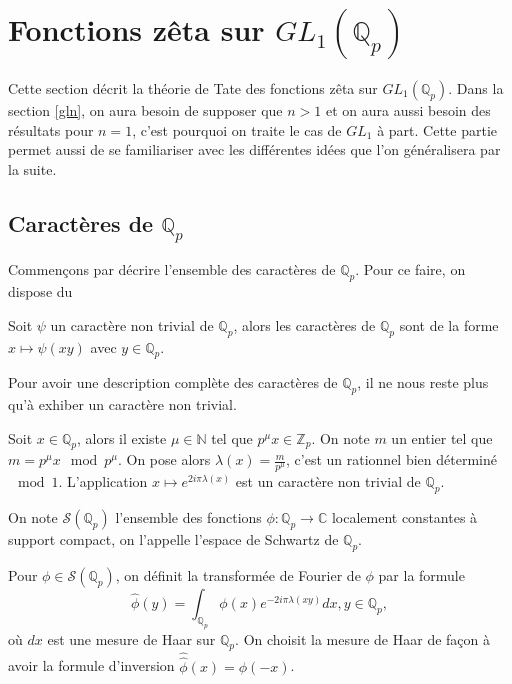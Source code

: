 \section{Fonctions zêta sur $GL_1(\mathbb{Q}_p)$}

\label{gl1}

Cette section décrit la théorie de Tate \cite{tate} des fonctions zêta sur $GL_1(\mathbb{Q}_p)$. Dans la section \ref{gln}, on aura besoin de supposer que $n > 1$ et on aura aussi besoin des résultats pour $n=1$, c'est pourquoi on traite le cas de $GL_1$ à part. Cette partie permet aussi de se familiariser avec les différentes idées que l'on généralisera par la suite.

\subsection{Caractères de $\mathbb{Q}_p$}
\label{caracqp}
Commençons par décrire l'ensemble des caractères de $\mathbb{Q}_p$. Pour ce faire, on dispose du

\begin{lemme}
Soit $\psi$ un caractère non trivial de $\mathbb{Q}_p$, alors les caractères de $\mathbb{Q}_p$ sont de la forme $x \mapsto \psi(xy)$ avec $y \in \mathbb{Q}_p$.
\end{lemme}

Pour avoir une description complète des caractères de $\mathbb{Q}_p$, il ne nous reste plus qu'à exhiber un caractère non trivial.

Soit $x \in \mathbb{Q}_p$, alors il existe $\mu \in \mathbb{N}$ tel que $p^\mu x \in \mathbb{Z}_p$. On note $m$ un entier tel que $m = p^\mu x \mod p^\mu$. On pose alors $\lambda(x) = \frac{m}{p^\mu}$, c'est un rationnel bien déterminé $\mod 1$. L'application $x \mapsto e^{2i\pi \lambda(x)}$ est un caractère non trivial de $\mathbb{Q}_p$.

On note $\mathcal{S}(\mathbb{Q}_p)$ l'ensemble des fonctions $\phi : \mathbb{Q}_p \rightarrow \mathbb{C}$ localement constantes à support compact, on l'appelle l'espace de Schwartz de $\mathbb{Q}_p$.

Pour $\phi \in \mathcal{S}(\mathbb{Q}_p)$, on définit la transformée de Fourier de $\phi$ par la formule
\begin{equation}
\hat{\phi}(y) = \int_{\mathbb{Q}_p} \phi(x) e^{-2i\pi \lambda(xy)}dx, y \in \mathbb{Q}_p,
\end{equation}
où $dx$ est une mesure de Haar sur $\mathbb{Q}_p$. On choisit la mesure de Haar de façon à avoir la formule d'inversion $\hat{\hat{\phi}}(x)=\phi(-x)$.

